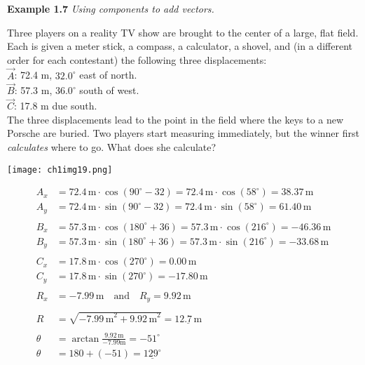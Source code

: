 \begin{examplebox}
\textbf{Example 1.7} \textit{Using components to add vectors.}

Three players on a reality TV show are brought to the center of a large, flat field. Each is given a meter stick, a compass, a calculator, a shovel, and (in a different order for each contestant) the following three displacements:\\

$\overrightarrow{A}$: 72.4 m, $32.0^\circ$ east of north.\\
$\overrightarrow{B}$: 57.3 m, $36.0^\circ$ south of west.\\
$\overrightarrow{C}$: 17.8 m due south.\\

The three displacements lead to the point in the field where the keys to a new Porsche are buried. Two players start measuring immediately, but the winner first \textit{calculates} where to go. What does she calculate?

\begin{center}
\texttt{[image: ch1img19.png]}
\end{center}
\begin{mathbox}
\begin{align*}
A_x &= 72.4\, \text{m} \cdot \cos \left(90^\circ - 32\right) = 72.4\, \text{m} \cdot \cos \left(58^\circ\right) = 38.37\,\text{m}\\
A_y &= 72.4\, \text{m} \cdot \sin \left(90^\circ - 32\right) = 72.4\, \text{m} \cdot \sin \left(58^\circ\right) = 61.40\,\text{m}\\\\
B_x &= 57.3\, \text{m} \cdot \cos \left(180^\circ + 36\right) = 57.3\, \text{m} \cdot \cos \left(216^\circ\right) = -46.36\,\text{m}\\
B_y &= 57.3\, \text{m} \cdot \sin \left(180^\circ + 36\right) = 57.3\, \text{m} \cdot \sin \left(216^\circ\right) = -33.68\,\text{m}\\\\
C_x &= 17.8\, \text{m} \cdot \cos \left(270^\circ\right) = 0.00\,\text{m}\\
C_y &= 17.8\, \text{m} \cdot \sin \left(270^\circ\right) = -17.80\,\text{m}\\\\
R_x &= -7.99\, \text{m} \quad \text{and} \quad R_y = 9.92\, \text{m}\\\\
R &= \sqrt{{-7.99\, \text{m}}^2 + {9.92\, \text{m}}^2} = \underline{12.7\, \text{m}}\\\\
\theta &= \arctan \frac{9.92\, \text{m}}{-7.99 \text{m}} = -51^\circ\\
\theta\,&= 180 + \left(-51\right) = \underline{129^\circ}
\end{align*}
\end{mathbox}
\end{examplebox}

